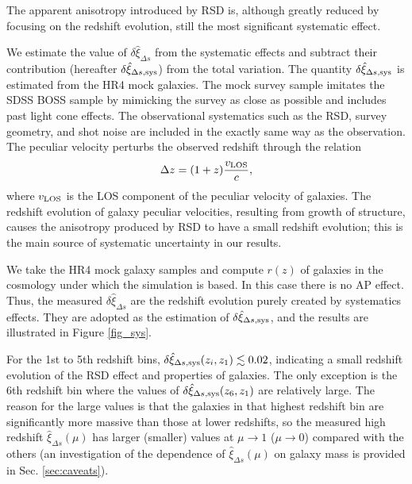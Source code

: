 \documentclass[iop]{emulateapj}
\begin{document}


The apparent anisotropy introduced by RSD is, 
although greatly reduced by focusing on the redshift evolution, 
still the most significant systematic effect.

We estimate the value of $\delta \hat\xi_{\Delta s}$ from the systematic effects and subtract their contribution
(hereafter $\delta\hat\xi_{\Delta s, \rm sys}$) from the total variation.
The quantity $\delta\hat\xi_{\Delta s, \rm sys}$ is estimated from the HR4 mock galaxies.
The mock survey sample imitates the SDSS BOSS sample by mimicking
the survey as close as possible and includes past light cone effects.
The observational systematics such as the RSD, survey geometry, and shot noise
are included in the exactly same way as the observation.
The peculiar velocity perturbs the observed redshift through the relation
\begin{equation}\label{eq:zvpeu}
\Delta z = (1+z) \frac{v_{{\rm LOS}}}{c},
\end{equation}
where $v_{\rm LOS}$ is the LOS component of the peculiar velocity of galaxies.
The redshift evolution of galaxy peculiar velocities, 
resulting from growth of structure,
causes the anisotropy produced by RSD to have a small redshift evolution; 
this is the main source of systematic uncertainty in our results. 

We take the HR4 mock galaxy samples and compute $r(z)$ of galaxies in the cosmology under which the simulation is based.
In this case there is no AP effect. 
Thus, the measured $\delta \hat\xi_{\Delta s}$ are the redshift evolution purely created by systematics effects.
They are adopted as the estimation of $\delta\hat\xi_{\Delta s, \rm sys}$,
and the results are illustrated in Figure \ref{fig_sys}. %

For the 1st to 5th redshift bins, $\delta\hat\xi_{\Delta s, \rm sys}(z_i,z_1)\lesssim0.02$,
indicating a small redshift evolution of the RSD effect and properties of galaxies.
The only exception is the 6th redshift bin where the values of $\delta\hat\xi_{\Delta s, \rm sys}(z_6,z_1)$ are relatively large.
The reason for the large values is that the galaxies in that highest redshift bin are significantly more massive than those at lower redshifts,
so the measured high redshift $\hat\xi_{\Delta s}(\mu)$ has larger (smaller) values at $\mu\rightarrow1$ ($\mu\rightarrow0$) 
compared with the others
(an investigation of the dependence of $\hat\xi_{\Delta s}(\mu)$ on galaxy mass is provided in Sec. \ref{sec:caveats}).
\end{document}

